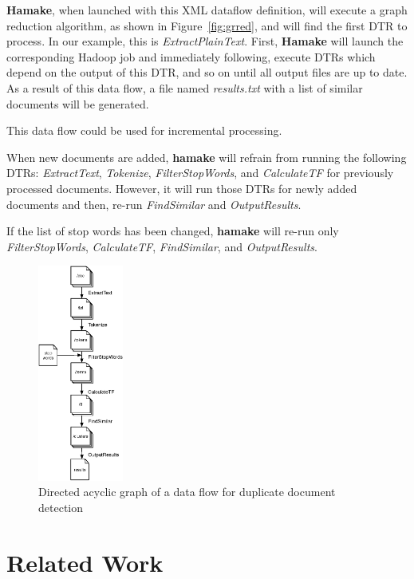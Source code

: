 \documentclass[10pt,conference,letterpaper]{IEEEtran}
\begin{document}
\textbf{Hamake}, when launched with this XML dataflow definition, will execute a graph reduction algorithm, as shown in Figure~\ref{fig:grred}, and will find the first DTR to process. In our example, this is
\emph{ExtractPlainText}. First, \textbf{Hamake} will launch the  corresponding Hadoop job and immediately following, execute DTRs which depend on the output of this DTR, and so on until all output files are up to date. As a result of this data flow, a file named
\emph{results.txt} with a list of similar documents will be generated.

This data flow could be used for incremental processing. 

When new documents are added, \textbf{hamake} will refrain from running the following DTRs: \emph{ExtractText}, \emph{Tokenize}, \emph{FilterStopWords}, and \emph{CalculateTF} for previously processed documents. However, it will run those DTRs for newly added documents and then, re-run \emph{FindSimilar} and \emph{OutputResults}. 

If the list of stop
words has been changed, \textbf{hamake} will re-run only
\emph{FilterStopWords}, \emph{CalculateTF}, \emph{FindSimilar}, and
\emph{OutputResults}.

\begin{figure}[htp]
\centering
\includegraphics[width=0.25\textwidth]{SimilarityAlgDAG.eps}
\caption{Directed acyclic graph of a data flow for duplicate document detection}
\label{fig:SimilarityAlgDAG}
\end{figure}

\section{Related Work}
\end{document}
